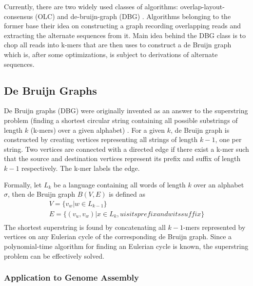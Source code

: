 Currently, there are two widely used classes of algorithms: overlap-layout-consensus (OLC) and de-bruijn-graph (DBG) \cite{alg-compare}. Algorithms belonging to the former base their idea on constructing a graph recording overlapping reads and extracting the alternate sequences from it. Main idea behind the DBG class is to chop all reads into k-mers that are then uses to construct a de Bruijn graph which is, after some optimizations, is subject to derivations of alternate sequences.

\subsection{De Bruijn Graphs}
\label{subsec:de-bruijn-graphs}

De Bruijn graphs (DBG) were originally invented as an answer to the superstring problem  (finding a shortest circular string containing all possible substrings of length $k$ (k-mers) over a given alphabet) \cite{dbg-apply}. For a given $k$, de Bruijn graph is constructed by creating vertices representing all strings of length $k-1$, one per string. Two vertices are connected with a directed edge if there exist a k-mer such that the source and destination vertices represent its prefix and suffix of length $k-1$ respectively. The k-mer labels the edge. 

Formally, let $L_k$ be a language containing all words of length $k$ over an alphabet $\sigma$, then de Bruijn graph $B(V, E)$ is defined as
\begin{gather}
V = \{v_w | w \in L_{k-1}\} \\
E = \{(v_u, v_w) | x \in L_k,  u is its prefix and w its suffix \} \\
\end{gather}
The shortest superstring is found by concatenating all $k-1$-mers represented by vertices on any Eulerian cycle of the corresponding de Bruijn graph. Since a polynomial-time algorithm for finding an Eulerian cycle is known, the superstring problem can be effectively solved.

\subsubsection{Application to Genome Assembly}
\label{subsub:dbg-application-to-genome-assembly}

